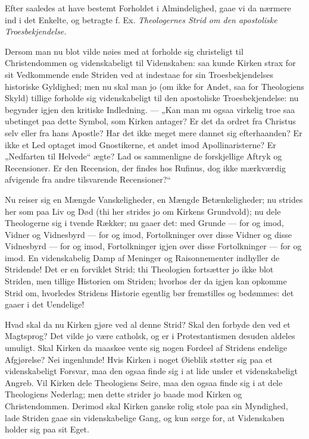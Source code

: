 \documentclass[12pt,a4paper]{book}
\newcommand{\opage}[1]{\marginnote{\footnotesize\textit{[#1]}}}
\begin{document}
Efter saaledes at have bestemt Forholdet i Almindelighed, gaae vi da nærmere
ind i det Enkelte, og betragte f. Ex. \emph{Theologernes Strid om den
apostoliske Troesbekjendelse.}

Dersom man nu blot vilde nøies med at forholde sig christeligt til
Christendommen og videnskabeligt til Videnskaben: saa kunde Kirken strax for
sit Vedkommende ende Striden ved at indestaae for sin Troesbekjendelses
historiske Gyldighed; men nu skal man jo (om ikke for Andet, saa for
Theologiens Skyld) tillige forholde sig videnskabeligt til den apostoliske
Troesbekjendelse: nu begynder igjen den kritiske Indledning. --- „Kan man nu
ogsaa virkelig troe saa ubetinget paa dette Symbol, som Kirken antager? Er det
da ordret fra Christus selv eller fra hans Apostle? Har det ikke meget mere
dannet sig efterhaanden? Er ikke et Led optaget imod Gnostikerne, et andet imod
Apollinaristerne? Er „Nedfarten til Helvede“ ægte? Lad os sammenligne de
forskjellige Aftryk og Recensioner. Er den Recension, der findes hos Rufinus,
dog ikke mærkværdig afvigende fra andre tilsvarende Recensioner?“

\opage{21} Nu reiser sig en Mængde Vanskeligheder, en Mængde Betænkeligheder; nu strides
her som paa Liv og Død (thi her strides jo om Kirkens Grundvold); nu dele
Theologerne sig i tvende Rækker; nu gaaer det: med Grunde --- for og imod,
Vidner og Vidnesbyrd --- for og imod, Fortolkninger over disse Vidner og disse
Vidnesbyrd --- for og imod, Fortolkninger igjen over disse Fortolkninger ---
for og imod. En videnskabelig Damp af Meninger og Raisonnementer indhyller de
Stridende! Det er en forviklet Strid; thi Theologien fortsætter jo ikke blot
Striden, men tillige Historien om Striden; hvorhos der da igjen kan opkomme
Strid om, hvorledes Stridens Historie egentlig bør fremstilles og bedømmes: det
gaaer i det Uendelige!

Hvad skal da nu Kirken gjøre ved al denne Strid? Skal den forbyde den ved et
Magtsprog? Det vilde jo være catholsk, og er i Protestantismen desuden aldeles
umuligt. Skal Kirken da maaskee vente sig nogen Fordeel af Stridens endelige
Afgjørelse? Nei ingenlunde! Hvis Kirken i noget Øieblik støtter sig paa et
videnskabeligt Forsvar, maa den ogsaa finde sig i at lide under et
videnskabeligt Angreb. Vil Kirken dele Theologiens Seire, maa den ogsaa finde
sig i at dele Theologiens Nederlag; men dette strider jo baade mod Kirken og
Christendommen. Derimod skal Kirken ganske rolig stole paa sin Myndighed, lade
Striden gaae sin videnskabelige Gang, og kun sørge for, at Videnskaben holder
sig paa sit Eget.
\end{document}
